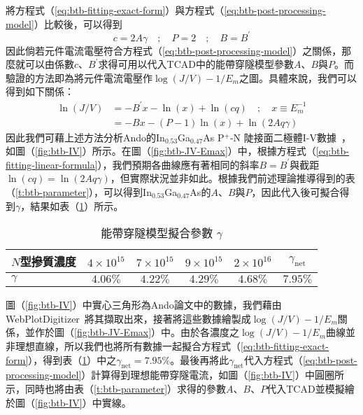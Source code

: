 將方程式（\ref{eq:btb-fitting-exact-form}）與方程式（\ref{eq:btb-post-processing-model}）比較後，可以得到
\begin{equation}
c=2A\gamma\quad;\quad P=2\quad;\quad B=B^\prime
\end{equation}
因此倘若元件電流電壓符合方程式（\ref{eq:btb-post-processing-model}）之關係，那麼就可以由係數$c$、$B^\prime$求得可用以代入TCAD中的能帶穿隧模型參數$A$、$B$與$P$。而驗證的方法即為將元件電流電壓作$\log(J/V)-1/E_m$之圖。具體來說，我們可以得到如下關係：
\begin{equation}\label{eq:btb-fitting-linear-formula}
\begin{aligned}
\ln\left(J/V\right)&=-B^\prime x-\ln(x)+\ln\left(cq\right)\quad;\quad x\equiv E_m^{-1}\\[5pt]
&=-Bx-(P-1)\ln(x)+\ln\left(2Aq\gamma\right)
\end{aligned}
\end{equation}
因此我們可藉上述方法分析Ando的In$_{0.53}$Ga$_{0.47}$As P$^+$-N 陡接面二極體I-V數據~\cite{Ando:1980fn}，如圖（\ref{fig:btb-IV}）所示。在圖（\ref{fig:btb-JV-Emax}）中，根據方程式（\ref{eq:btb-fitting-linear-formula}），我們預期各曲線應有著相同的斜率$B=B^\prime$與截距$\ln\left(cq\right)=\ln\left(2Aq\gamma\right)$，但實際狀況並非如此。根據我們前述理論推導得到的表（\ref{t:btb-parameter}），可以得到In$_{0.53}$Ga$_{0.47}$As的$A$、$B$與$P$，因此代入後可擬合得到$\gamma$，結果如表（\ref{t:btb-ando-fitting-parameter}）所示。
\begin{table}[h]
\begin{center}
\caption[能帶穿隧模型擬合參數]{能帶穿隧模型擬合參數 $\gamma$} \label{t:btb-ando-fitting-parameter}
\begin{tabular}{lccccc}
\hline
  $N$型摻質濃度  & $4\times10^{15}$ & $7\times10^{15}$ & $9\times10^{15}$ & $2\times10^{16}$ & $\gamma_\text{net}$\\
\hline
$\gamma$ & $4.06\%$ & $4.22\%$ & $4.29\%$ & $4.68\%$ & $7.95\%$\\
\hline
\end{tabular}
\end{center}
\end{table}
圖（\ref{fig:btb-IV}）中實心三角形為Ando論文中的數據，我們藉由WebPlotDigitizer~\cite{rohatgi2011webplotdigitizer}將其擷取出來，接著將這些數據繪製成$\log(J/V)-1/E_m$關係，並作於圖（\ref{fig:btb-JV-Emax}）中。由於各濃度之$\log(J/V)-1/E_m$曲線並非理想直線，所以我們也將所有數據一起擬合方程式（\ref{eq:btb-fitting-exact-form}），得到表（\ref{t:btb-ando-fitting-parameter}）中之$\gamma_\text{net}=7.95\%$。最後再將此$\gamma_\text{net}$代入方程式（\ref{eq:btb-post-processing-model}）計算得到理想能帶穿隧電流，如圖（\ref{fig:btb-IV}）中圓圈所示，同時也將由表（\ref{t:btb-parameter}）求得的參數$A$、$B$、$P$代入TCAD並模擬繪於圖（\ref{fig:btb-IV}）中實線。
